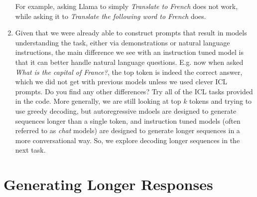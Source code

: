 \documentclass[11pt,a4paper]{article}
\begin{document}
\begin{enumerate}[label=(\alph*)]
          For example, asking Llama to simply \emph{Translate to French} does
          not work, while asking it to
          \emph{Translate the following word to French} does.
    \item Given that we were already able to construct prompts that result in
          models understanding the task, either via demonstrations or natural
          language instructions, the main difference we see with an instruction
          tuned model is that it can better handle natural language questions.
          E.g. now when asked \emph{What is the capital of France?}, the top
          token is indeed the correct answer, which we did not get with previous
          models unless we used clever ICL prompts.
          Do you find any other differences? Try all of the ICL tasks provided
          in the code.
          More generally, we are still looking at top $k$ tokens and trying to
          use greedy decoding, but autoregressive mdoels are designed to
          generate sequences longer than a single token, and instruction tuned
          models (often referred to as \emph{chat} models) are designed to
          generate longer sequences in a more conversational way.
          So, we explore decoding longer sequences in the next task.
\end{enumerate}

\section{Generating Longer Responses}
\end{document}
